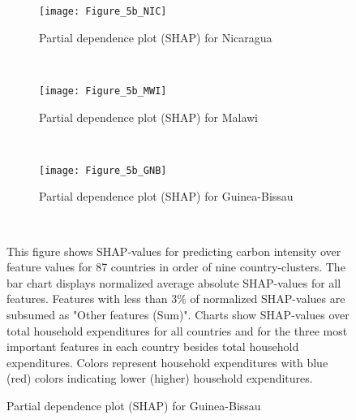 \begin{figure}[ht!]\ContinuedFloat
    \centering
   \begin{subfigure}[b]{\textwidth}
         \centering
         \caption{Partial dependence plot (SHAP) for Nicaragua}
         \label{fig:5b_NIC}
         \texttt{[image: Figure\_5b\_NIC]}         
     \end{subfigure}
    \\
    \vspace{0.5cm}
   \begin{subfigure}[b]{\textwidth}
         \centering
         \caption{Partial dependence plot (SHAP) for Malawi}
         \label{fig:5b_MWI}
         \texttt{[image: Figure\_5b\_MWI]}         
     \end{subfigure}
    \\
    \vspace{0.5cm}
   \begin{subfigure}[b]{\textwidth}
         \centering
         \caption{Partial dependence plot (SHAP) for Guinea-Bissau}
         \label{fig:5b_GNB}
         \texttt{[image: Figure\_5b\_GNB]}
    \end{subfigure}
    \\
    \vspace{0.5cm}
    \begin{subcaption2}
     This figure shows SHAP-values for predicting carbon intensity over feature values for 87 countries in order of nine country-clusters. The bar chart displays normalized average absolute SHAP-values for all features. Features with less than 3\% of normalized SHAP-values are subsumed as "Other features (Sum)". Charts show SHAP-values over total household expenditures for all countries and for the three most important features in each country besides total household expenditures. Colors represent household expenditures with blue (red) colors indicating lower (higher) household expenditures.
     \end{subcaption2}
\end{figure}


